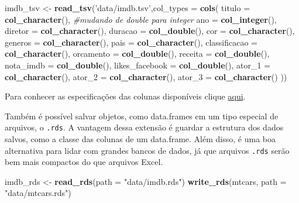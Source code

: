 \documentclass[
]{book}
\newenvironment{Shaded}{\begin{snugshade}}{\end{snugshade}}
\newcommand{\CommentTok}[1]{\textcolor[rgb]{0.56,0.35,0.01}{\textit{#1}}}
\newcommand{\DataTypeTok}[1]{\textcolor[rgb]{0.13,0.29,0.53}{#1}}
\newcommand{\KeywordTok}[1]{\textcolor[rgb]{0.13,0.29,0.53}{\textbf{#1}}}
\newcommand{\NormalTok}[1]{#1}
\newcommand{\StringTok}[1]{\textcolor[rgb]{0.31,0.60,0.02}{#1}}
\begin{document}
\begin{Shaded}
\begin{Highlighting}[]
\NormalTok{imdb_tsv <-}\StringTok{ }\KeywordTok{read_tsv}\NormalTok{(}\StringTok{'data/imdb.tsv'}\NormalTok{,}\DataTypeTok{col_types =}  
 \KeywordTok{cols}\NormalTok{(}
  \DataTypeTok{titulo =} \KeywordTok{col_character}\NormalTok{(),}
  \CommentTok{#mudando de double para integer}
  \DataTypeTok{ano =} \KeywordTok{col_integer}\NormalTok{(),}
  \DataTypeTok{diretor =} \KeywordTok{col_character}\NormalTok{(),}
  \DataTypeTok{duracao =} \KeywordTok{col_double}\NormalTok{(),}
  \DataTypeTok{cor =} \KeywordTok{col_character}\NormalTok{(),}
  \DataTypeTok{generos =} \KeywordTok{col_character}\NormalTok{(),}
  \DataTypeTok{pais =} \KeywordTok{col_character}\NormalTok{(),}
  \DataTypeTok{classificacao =} \KeywordTok{col_character}\NormalTok{(),}
  \DataTypeTok{orcamento =} \KeywordTok{col_double}\NormalTok{(),}
  \DataTypeTok{receita =} \KeywordTok{col_double}\NormalTok{(),}
  \DataTypeTok{nota_imdb =} \KeywordTok{col_double}\NormalTok{(),}
  \DataTypeTok{likes_facebook =} \KeywordTok{col_double}\NormalTok{(),}
  \DataTypeTok{ator_1 =} \KeywordTok{col_character}\NormalTok{(),}
  \DataTypeTok{ator_2 =} \KeywordTok{col_character}\NormalTok{(),}
  \DataTypeTok{ator_3 =} \KeywordTok{col_character}\NormalTok{()}
\NormalTok{))}
\end{Highlighting}
\end{Shaded}

Para conhecer as especificações das colunas disponíveis clique \href{https://readr.tidyverse.org/articles/readr.html\#available-column-specifications}{aqui}.

Também é possível salvar objetos, como data.frames em um tipo especial de arquivos, o \texttt{.rds}. A vantagem dessa extensão é guardar a estrutura dos dados salvos, como a classe das colunas de um data.frame. Além disso, é uma boa alternativa para lidar com grandes bancos de dados, já que arquivos \texttt{.rds} serão bem mais compactos do que arquivos Excel.

\begin{Shaded}
\begin{Highlighting}[]
\NormalTok{imdb_rds <-}\StringTok{ }\KeywordTok{read_rds}\NormalTok{(}\DataTypeTok{path =} \StringTok{"data/imdb.rds"}\NormalTok{)}
\KeywordTok{write_rds}\NormalTok{(mtcars, }\DataTypeTok{path =} \StringTok{"data/mtcars.rds"}\NormalTok{)}
\end{Highlighting}
\end{Shaded}
\end{document}
